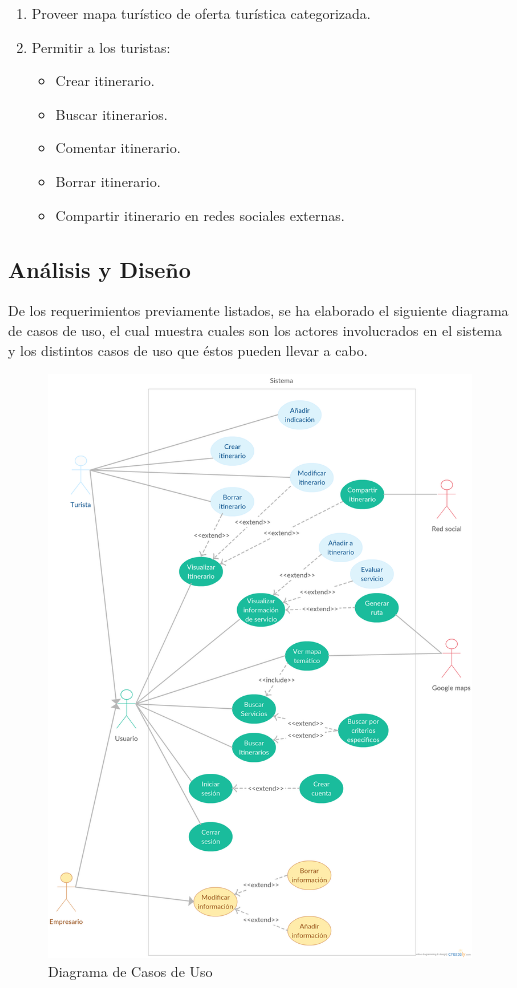 \documentclass[12pt]{article}
\begin{document}
\begin{enumerate}
\begin{itemize}
	\end{itemize}
\item Proveer mapa turístico de oferta turística categorizada.
\item Permitir a los turistas:
	\begin{itemize}
		\item Crear itinerario.
		\item Buscar itinerarios.
		\item Comentar itinerario.
		\item Borrar itinerario.
		\item Compartir itinerario en redes sociales externas.		
	\end{itemize}
\end{enumerate}
\newpage
%
%
\subsection{Análisis y Diseño	} 
De los requerimientos previamente listados, se ha elaborado el siguiente diagrama de casos de uso, el cual muestra cuales son los actores involucrados en el sistema y los distintos casos de uso que éstos pueden llevar a cabo.
\begin{figure}[htp]
\centering
\includegraphics[scale=0.20]{Informe/cu.png}
\caption{Diagrama de Casos de Uso}
\label{}
\end{figure}
%
%
\end{document}
